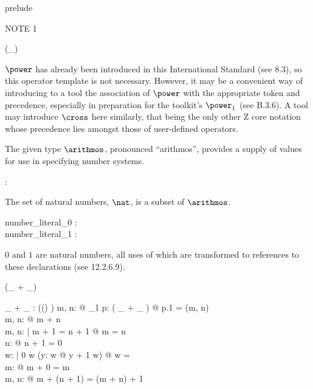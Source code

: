 \begin{zsection}
\SECTION prelude
\end{zsection}


NOTE 1
\begin{zed}
\generic (\power \_)
\end{zed}
$\power$ has already been introduced in this International Standard
(see 8.3),
so this operator template is not necessary.
However, it may be a convenient way of introducing to a tool
the association of $\power$ with the appropriate token and precedence,
especially in preparation for the toolkit's $\power_1$ (see B.3.6).
A tool may introduce $\cross$ here similarly,
that being the only other Z core notation whose precedence
lies amongst those of user-defined operators.


\begin{zed}
[\arithmos]
\end{zed}

The given type $\arithmos$, pronounced ``arithmos'', provides
a supply of values for use in specifying number systems.

\begin{axdef}
\nat : \power \arithmos
\end{axdef}

The set of natural numbers, $\nat$, is a subset of $\arithmos$.


\begin{axdef}
  number\_literal\_0 : \nat\\
  number\_literal\_1 : \nat
\end{axdef}

$0$ and $1$ are natural numbers, all uses of which are transformed
to references to these declarations (see 12.2.6.9).

\begin{zed}
 \leftassoc (\_ + \_)
\end{zed}

\begin{axdef}
\_ + \_ : \power ((\arithmos \cross \arithmos) \cross \arithmos)
\where
\forall m, n: \nat @ \exists_1 p: ( \_ + \_ ) @ p.1 = (m, n)\\
\forall m, n: \nat @ m + n \in \nat\\
\forall m, n: \nat | m + 1 = n + 1 @ m = n\\
\forall n: \nat @ \lnot n + 1 = 0\\
\forall w: \power \nat | 0 \in w \land (\forall y: w @ y + 1 \in w) @ w = \nat\\
\forall m: \nat @ m + 0 = m\\
\forall m, n: \nat @ m + (n + 1) = (m + n) + 1
\end{axdef}


